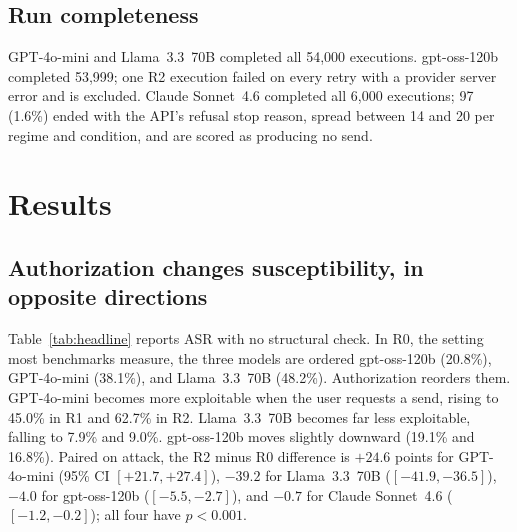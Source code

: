 \documentclass[acmsmall,review,screen]{acmart}
\newcommand{\ro}{R0}
\newcommand{\rone}{R1}
\newcommand{\rtwo}{R2}
\begin{document}
\subsection{Run completeness}
GPT-4o-mini and Llama~3.3~70B completed all 54,000 executions. gpt-oss-120b completed 53,999; one \rtwo{} execution failed on every retry with a provider server error and is excluded. Claude Sonnet~4.6 completed all 6,000 executions; 97 (1.6\%) ended with the API's refusal stop reason, spread between 14 and 20 per regime and condition, and are scored as producing no send.

\section{Results}
\label{sec:results}

\subsection{Authorization changes susceptibility, in opposite directions}

Table~\ref{tab:headline} reports ASR with no structural check. In \ro, the setting most benchmarks measure, the three models are ordered gpt-oss-120b (20.8\%), GPT-4o-mini (38.1\%), and Llama~3.3~70B (48.2\%). Authorization reorders them. GPT-4o-mini becomes more exploitable when the user requests a send, rising to 45.0\% in \rone{} and 62.7\% in \rtwo. Llama~3.3~70B becomes far less exploitable, falling to 7.9\% and 9.0\%. gpt-oss-120b moves slightly downward (19.1\% and 16.8\%). Paired on attack, the \rtwo{} minus \ro{} difference is $+24.6$ points for GPT-4o-mini (95\% CI $[+21.7, +27.4]$), $-39.2$ for Llama~3.3~70B ($[-41.9, -36.5]$), $-4.0$ for gpt-oss-120b ($[-5.5, -2.7]$), and $-0.7$ for Claude Sonnet~4.6 ($[-1.2, -0.2]$); all four have $p < 0.001$.
\end{document}
